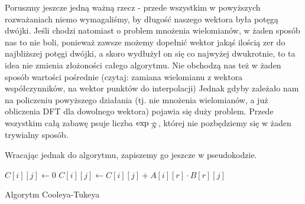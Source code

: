 Poruszmy jeszcze jedną ważną rzecz - przede wszystkim w powyższych rozważaniach niemo wymagaliśmy, by długość naszego wektora była potęgą dwójki. Jeśli chodzi natomiast o problem mnożenia wielomianów, w żaden sposób nas to nie boli, ponieważ zawsze możemy dopełnić wektor jakąś ilością zer do najbliższej potęgi dwójki, a skoro wydłużył on się co najwyżej dwukrotnie, to ta idea nie zmienia złożoności całego algorytmu.
Nie obchodzą nas też w żaden sposób wartości pośrednie (czytaj: zamiana wielomianu z wektora współczynników, na wektor punktów do interpolacji)
Jednak gdyby zależało nam na policzeniu powyższego działania (tj. nie mnożenia wielomianów, a już obliczenia DFT dla dowolnego wektora) pojawia się duży problem. Przede wszystkim całą zabawę psuje liczba $\exp{\frac{\mathunderscore}{N}}$, której nie pozbędziemy się w żaden trywialny sposób.

Wracając jednak do algorytmu, zapiszemy go jeszcze w pseudokodzie.
\begin{algorithm}[H]
  \DontPrintSemicolon



  {
     {
	$C[i][j] \leftarrow 0$\;
	{
	  $C[i][j] \leftarrow C[i][j] + A[i][r] \cdot B[r][j]$\;
	}
     }
  }

  \caption{Algorytm Cooleya-Tukeya}
  \label{alg-fft-cooley-tukey}
\end{algorithm}
